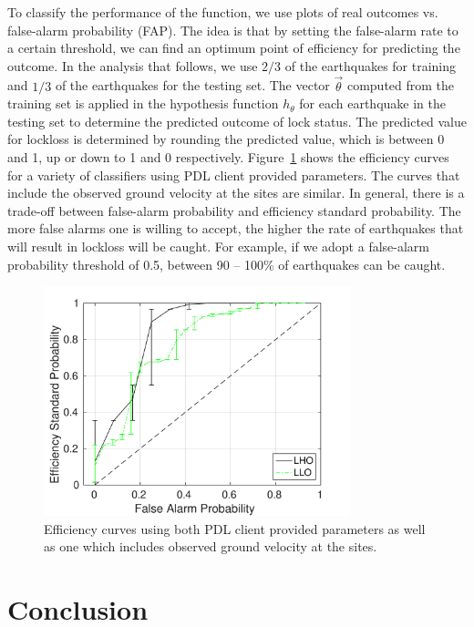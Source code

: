 \documentclass[reprint, prl, aps, showpacs]{revtex4-1}
\begin{document}
To classify the performance of the function, we use plots of real outcomes vs. false-alarm probability (FAP). The idea is that by setting the false-alarm rate to a certain threshold, we can find an optimum point of efficiency for predicting the outcome. In the analysis that follows, we use $2/3$ of the earthquakes for training and  $1/3$ of the earthquakes for the testing set. The vector $\vec\theta$  computed from the training set is applied in the hypothesis function $h_{\theta}$ for each earthquake in the testing set to determine the predicted outcome of lock status. The predicted value for lockloss is determined by rounding the predicted value, which is between 0 and 1, up or down to 1 and 0 respectively.
Figure~\ref{fig:MLA} shows the efficiency curves for a variety of classifiers using PDL client provided parameters. The curves that include the observed ground velocity at the sites are similar. In general, there is a trade-off between false-alarm probability and efficiency standard probability. The more false alarms one is willing to accept, the higher the rate of earthquakes that will result in lockloss will be caught. For example, if we adopt a false-alarm probability threshold of 0.5, between 90 -- 100\% of earthquakes can be caught.
	
\begin{figure}[h]
 \includegraphics[width=3.5in]{lockloss_fap_errorbars.pdf}
 \centering
 \caption{Efficiency curves using both PDL client provided parameters as well as one which includes observed ground velocity at the sites.}
 \label{fig:MLA}
\end{figure}
	
	


\section{Conclusion}
\label{sec:conclusions}
\end{document}
